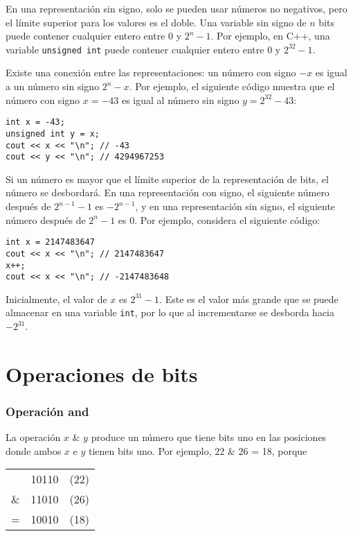 En una representación sin signo, solo se pueden usar
números no negativos, pero el límite superior para los valores es el doble.
Una variable sin signo de $n$ bits puede contener cualquier
entero entre $0$ y $2^n-1$.
Por ejemplo, en C++, una variable \texttt{unsigned int}
puede contener cualquier entero entre $0$ y $2^{32}-1$.

Existe una conexión entre las
representaciones:
un número con signo $-x$ es igual a un número sin signo $2^n-x$.
Por ejemplo, el siguiente código muestra que
el número con signo $x=-43$ es igual al número sin signo
$y=2^{32}-43$:
\begin{lstlisting}
int x = -43;
unsigned int y = x;
cout << x << "\n"; // -43
cout << y << "\n"; // 4294967253
\end{lstlisting}

Si un número es mayor que el límite superior
de la representación de bits, el número se desbordará.
En una representación con signo,
el siguiente número después de $2^{n-1}-1$ es $-2^{n-1}$,
y en una representación sin signo,
el siguiente número después de $2^n-1$ es $0$.
Por ejemplo, considera el siguiente código:
\begin{lstlisting}
int x = 2147483647
cout << x << "\n"; // 2147483647
x++;
cout << x << "\n"; // -2147483648
\end{lstlisting}

Inicialmente, el valor de $x$ es $2^{31}-1$.
Este es el valor más grande que se puede almacenar
en una variable \texttt{int},
por lo que al incrementarse se desborda hacia $-2^{31}$.


\section{Operaciones de bits}

\newcommand\XOR{\mathbin{\char`\^}}

\subsubsection{Operación and}


La operación  $x$ \& $y$ produce un número
que tiene bits uno en las posiciones donde ambos
$x$ e $y$ tienen bits uno.
Por ejemplo, $22$ \& $26$ = 18, porque

\begin{center}
    \begin{tabular}{rrr}
           & 10110 & (22) \\
        \& & 11010 & (26) \\
        \hline
        =  & 10010 & (18) \\
    \end{tabular}
\end{center}

